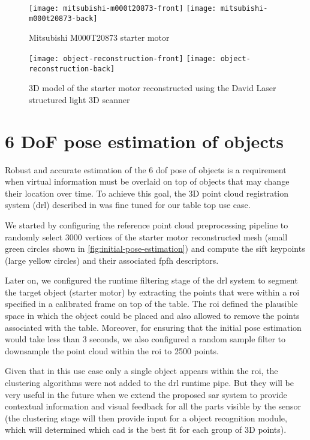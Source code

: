 \begin{figure}[!ht]
	\centering
	\texttt{[image: mitsubishi-m000t20873-front]}
	\texttt{[image: mitsubishi-m000t20873-back]}
	\caption{Mitsubishi M000T20873 starter motor}
	\label{fig:starter-motor}
\end{figure}

\begin{figure}[!ht]
	\centering
	\texttt{[image: object-reconstruction-front]}
	\texttt{[image: object-reconstruction-back]}
	\caption{3D model of the starter motor reconstructed using the David Laser structured light 3D scanner}
	\label{fig:object-reconstruction}
\end{figure}



\section{6 DoF pose estimation of objects}\label{sec:pose-estimation}

Robust and accurate estimation of the 6 \gls{dof} pose of objects is a requirement when virtual information must be overlaid on top of objects that may change their location over time. To achieve this goal, the 3D point cloud registration system (drl) described in \cite{Costa2016} was fine tuned for our table top use case.

We started by configuring the reference point cloud preprocessing pipeline to randomly select 3000 vertices of the starter motor reconstructed mesh (small green circles shown in \cref{fig:initial-pose-estimation}) and compute the \gls{sift} \cite{Lowe2004} keypoints (large yellow circles) and their associated \gls{fpfh} \cite{Rusu2009} descriptors.

Later on, we configured the runtime filtering stage of the drl system to segment the target object (starter motor) by extracting the points that were within a \gls{roi} specified in a calibrated frame on top of the table. The \gls{roi} defined the plausible space in which the object could be placed and also allowed to remove the points associated with the table. Moreover, for ensuring that the initial pose estimation would take less than 3 seconds, we also configured a random sample filter to downsample the point cloud within the \gls{roi} to 2500 points.

Given that in this use case only a single object appears within the \gls{roi}, the clustering algorithms were not added to the drl runtime pipe. But they will be very useful in the future when we extend the proposed \gls{sar} system to provide contextual information and visual feedback for all the parts visible by the sensor (the clustering stage will then provide input for a object recognition module, which will determined which \gls{cad} is the best fit for each group of 3D points).

